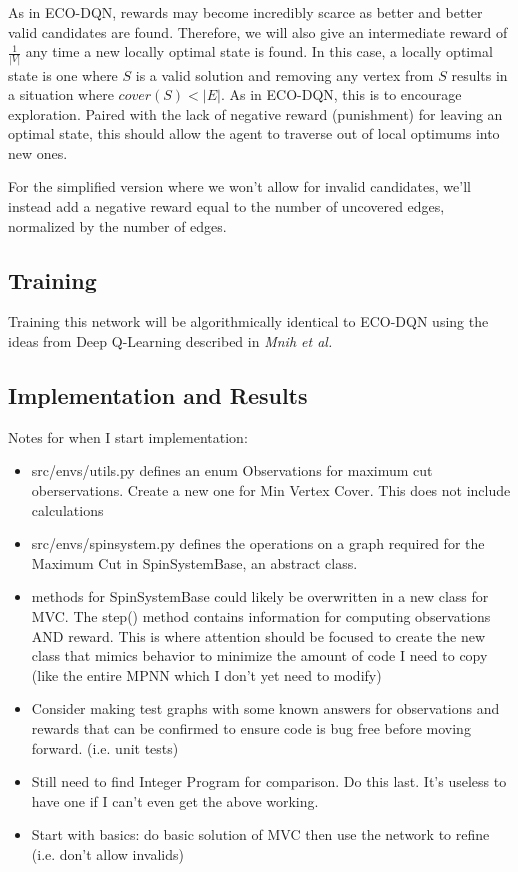 \documentclass{article}
\begin{document}
As in ECO-DQN, rewards may become incredibly scarce as better and better valid candidates are found. Therefore, we will also give an intermediate reward of $\frac{1}{|V|}$ any time a new locally optimal state is found. In this case, a locally optimal state is one where $S$ is a valid solution and removing any vertex from $S$ results in a situation where $cover(S) < |E|$. As in ECO-DQN, this is to encourage exploration. Paired with the lack of negative reward (punishment) for leaving an optimal state, this should allow the agent to traverse out of local optimums into new ones.

For the simplified version where we won't allow for invalid candidates, we'll instead add a negative reward equal to the number of uncovered edges, normalized by the number of edges. 

\subsection{Training}

Training this network will be algorithmically identical to ECO-DQN using the ideas from Deep Q-Learning described in \textit{Mnih et al.} \cite{deepmind_2015}

\subsection{Implementation and Results}

Notes for when I start implementation: 

\begin{itemize}
    \item src/envs/utils.py defines an enum Observations for maximum cut oberservations. Create a new one for Min Vertex Cover. This does not include calculations
    \item src/envs/spinsystem.py defines the operations on a graph required for the Maximum Cut in SpinSystemBase, an abstract class. 
    \item methods for SpinSystemBase could likely be overwritten in a new class for MVC. The step() method contains information for computing observations AND reward. This is where attention should be focused to create the new class that mimics behavior to minimize the amount of code I need to copy (like the entire MPNN which I don't yet need to modify)
    \item Consider making test graphs with some known answers for observations and rewards that can be confirmed to ensure code is bug free before moving forward. (i.e. unit tests)
    \item Still need to find Integer Program for comparison. Do this last. It's useless to have one if I can't even get the above working.
    \item Start with basics: do basic solution of MVC then use the network to refine (i.e. don't allow invalids)
\end{itemize}
\end{document}
